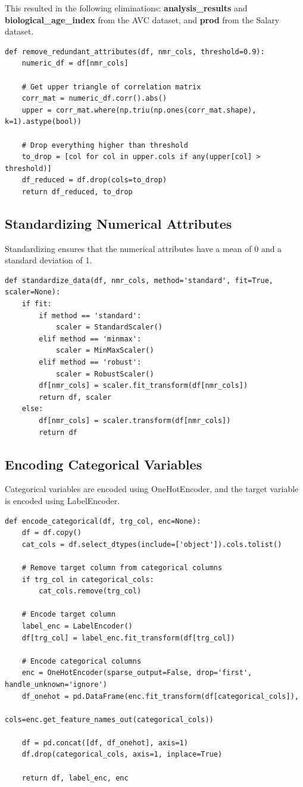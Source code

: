 \documentclass[a4paper,12pt]{article}
\begin{document}
This resulted in the following eliminations: \textbf{analysis\_results} and \textbf{biological\_age\_index} from the AVC dataset, and \textbf{prod} from the Salary dataset.
\begin{verbatim}
def remove_redundant_attributes(df, nmr_cols, threshold=0.9):
    numeric_df = df[nmr_cols]

    # Get upper triangle of correlation matrix
    corr_mat = numeric_df.corr().abs()
    upper = corr_mat.where(np.triu(np.ones(corr_mat.shape), k=1).astype(bool))

    # Drop everything higher than threshold
    to_drop = [col for col in upper.cols if any(upper[col] > threshold)]
    df_reduced = df.drop(cols=to_drop)
    return df_reduced, to_drop
\end{verbatim}


\newpage
\subsection{Standardizing Numerical Attributes}
Standardizing ensures that the numerical attributes have a mean of 0 and a standard deviation of 1.

\begin{verbatim}
def standardize_data(df, nmr_cols, method='standard', fit=True, scaler=None):
    if fit:
        if method == 'standard':
            scaler = StandardScaler()
        elif method == 'minmax':
            scaler = MinMaxScaler()
        elif method == 'robust':
            scaler = RobustScaler()
        df[nmr_cols] = scaler.fit_transform(df[nmr_cols])
        return df, scaler
    else:
        df[nmr_cols] = scaler.transform(df[nmr_cols])
        return df
\end{verbatim}

\subsection{Encoding Categorical Variables}
Categorical variables are encoded using OneHotEncoder, and the target variable is encoded using LabelEncoder.

\begin{verbatim}
def encode_categorical(df, trg_col, enc=None):
    df = df.copy()
    cat_cols = df.select_dtypes(include=['object']).cols.tolist()

    # Remove target column from categorical columns
    if trg_col in categorical_cols:
        cat_cols.remove(trg_col)
    
    # Encode target column
    label_enc = LabelEncoder()
    df[trg_col] = label_enc.fit_transform(df[trg_col])
    
    # Encode categorical columns
    enc = OneHotEncoder(sparse_output=False, drop='first', handle_unknown='ignore')
    df_onehot = pd.DataFrame(enc.fit_transform(df[categorical_cols]), 
                             cols=enc.get_feature_names_out(categorical_cols))
    
    df = pd.concat([df, df_onehot], axis=1)
    df.drop(categorical_cols, axis=1, inplace=True)
    
    return df, label_enc, enc
\end{verbatim}
\end{document}
